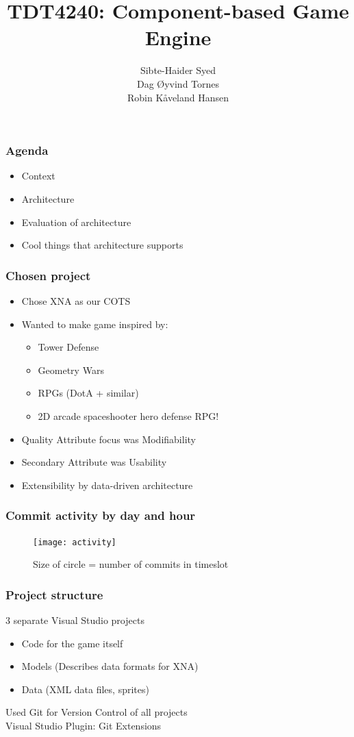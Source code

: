 \documentclass[screen]{beamer}
\title{TDT4240: Component-based Game Engine}
\author[finnrobi, sibtehai, tornes]{Sibte-Haider Syed\\
  Dag Øyvind Tornes\\
  Robin Kåveland Hansen}
\date{}
\begin{document}
\ntnutitlepage

\begin{frame}
  \frametitle{Agenda}
  \begin{itemize}
    \item Context
    \item Architecture
    \item Evaluation of architecture
    \item Cool things that architecture supports
  \end{itemize}
\end{frame}

\begin{frame}
  \frametitle{Chosen project}
  \begin{itemize}
    \item Chose XNA as our COTS
    \item Wanted to make game inspired by:
      \begin{itemize}
        \item Tower Defense
        \item Geometry Wars 
        \item RPGs (DotA + similar)
        \item 2D arcade spaceshooter hero defense RPG!
      \end{itemize}
    \item Quality Attribute focus was Modifiability
    \item Secondary Attribute was Usability
    \item Extensibility by data-driven architecture
  \end{itemize}
\end{frame}

\begin{frame}
  \frametitle{Commit activity by day and hour}
  \begin{figure}
    \texttt{[image: activity]}
    \caption{Size of circle = number of commits in timeslot}
  \end{figure}
\end{frame}

\begin{frame}
  \frametitle{Project structure}
  3 separate Visual Studio projects\\
  \begin{itemize}
    \item Code for the game itself
    \item Models (Describes data formats for XNA)
    \item Data (XML data files, sprites)
  \end{itemize}
  Used Git for Version Control of all projects\\
  Visual Studio Plugin: Git Extensions
\end{frame}
\end{document}
